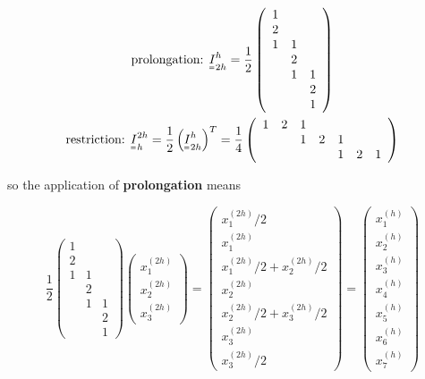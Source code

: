 \begin{equation}
    \begin{gathered}
        \text{prolongation: } \mat{I}_{2h}^{h} = \frac{1}{2}\left(\begin{array}{lll}
            1 & & \\
            2 & & \\
            1 & 1 & \\
            & 2 & \\
            & 1 & 1 \\
            & & 2 \\
            & & 1
            \end{array}\right) \\ \text{restriction: } \mat{I}_{h}^{2h} = \frac{1}{2} \left( \mat{I}_{2h}^{h} \right)^T = \frac{1}{4} \left(\begin{array}{lllllll}
                1 & 2 & 1 & & & & \\
                & & 1 & 2 & 1 & & \\
                & & & & 1 & 2 & 1
                \end{array}\right)
    \end{gathered}
\end{equation}

so the application of \textbf{prolongation} means

\begin{equation}
    \frac{1}{2}\left(\begin{array}{lll}
    1 & & \\
    2 & & \\
    1 & 1 & \\
    & 2 & \\
    & 1 & 1 \\
    & & 2 \\
    & & 1
    \end{array}\right)\left(\begin{array}{l}
    x^{(2h)}_1 \\
    x^{(2h)}_2 \\
    x^{(2h)}_3
    \end{array}\right)=\left(\begin{array}{l}
    x^{(2h)}_1 / 2 \\
    x^{(2h)}_1 \\
    x^{(2h)}_1 / 2+x^{(2h)}_2 / 2 \\
    x^{(2h)}_2 \\
    x^{(2h)}_2 / 2+x^{(2h)}_3 / 2 \\
    x^{(2h)}_3 \\
    x^{(2h)}_3 / 2
    \end{array}\right)=\left(\begin{array}{l}
    x^{(h)}_1 \\
    x^{(h)}_2 \\
    x^{(h)}_3 \\
    x^{(h)}_4 \\
    x^{(h)}_5 \\
    x^{(h)}_6 \\
    x^{(h)}_7
    \end{array}\right)
\end{equation}

